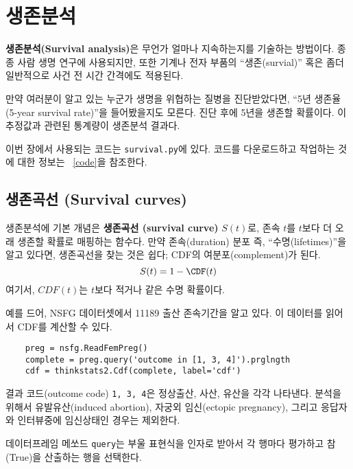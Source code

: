 
\chapter{생존분석}

{\bf 생존분석(Survival analysis)}은 무언가 얼마나 지속하는지를 기술하는 방법이다. 종종 사람 생명 연구에 사용되지만, 또한 기계나 전자 부품의 ``생존(survial)'' 혹은 좀더 일반적으로 사건 전 시간 간격에도 적용된다.

만약 여러분이 알고 있는 누군가 생명을 위협하는 질병을 진단받았다면, ``5년 생존율 (5-year survival rate)''을 들어봤을지도 모른다. 진단 후에 5년을 생존할 확률이다. 이 추정값과 관련된 통계량이 생존분석 결과다.

이번 장에서 사용되는 코드는 {\tt survival.py}에 있다.
코드를 다운로드하고 작업하는 것에 대한 정보는 ~\ref{code}을 참조한다.


\section{생존곡선 (Survival curves)}
\label{survival}

생존분석에 기본 개념은 {\bf 생존곡선 (survival curve)} $S(t)$로,
존속 $t$를 $t$보다 더 오래 생존할 확률로 매핑하는 함수다.
만약 존속(duration) 분포 즉, ``수명(lifetimes)''을 알고 있다면,
생존곡선을 찾는 것은 쉽다; CDF의 여분포(complement)가 된다.
%
\[ S(t) = 1 - \CDF(t) \]
%
여기서, $CDF(t)$는 $t$보다 적거나 같은 수명 확률이다.

예를 드어, NSFG 데이터셋에서 11189 출산 존속기간을 알고 있다.
이 데이터를 읽어서 CDF를 계산할 수 있다.

\begin{verbatim}
    preg = nsfg.ReadFemPreg()
    complete = preg.query('outcome in [1, 3, 4]').prglngth
    cdf = thinkstats2.Cdf(complete, label='cdf')
\end{verbatim}

결과 코드(outcome code) {\tt 1, 3, 4}은 정상출산, 사산, 유산을 각각 나타낸다.
분석을 위해서 유발유산(induced abortion), 자궁외 임신(ectopic pregnancy), 그리고 응답자와 인터뷰중에 임신상태인 경우는 제외한다.

데이터프레임 메쏘드 {\tt query}는 부울 표현식을 인자로 받아서 각 행마다 평가하고 참(True)을 산출하는 행을 선택한다.

